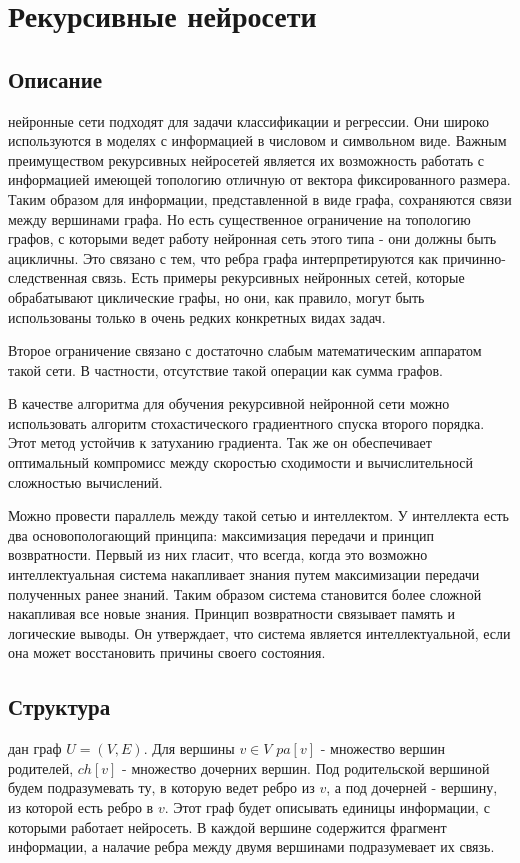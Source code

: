 \documentclass[14pt]{article}
\begin{document}
\section{Рекурсивные нейросети}

\subsection{Описание}
 нейронные сети подходят для задачи классификации и регрессии. Они широко используются в моделях с информацией в числовом и символьном виде. Важным преимуществом рекурсивных нейросетей является их возможность работать с информацией имеющей топологию отличную от вектора фиксированного размера. Таким образом для информации, представленной в виде графа, сохраняются связи между вершинами графа. Но есть существенное ограничение на топологию графов, с которыми ведет работу нейронная сеть этого типа - они должны быть ацикличны. Это связано с тем, что ребра графа интерпретируются как причинно-следственная связь. Есть примеры рекурсивных нейронных сетей, которые обрабатывают циклические графы, но они, как правило, могут быть использованы только в очень редких конкретных видах задач.


Второе ограничение связано с достаточно слабым математическим аппаратом такой сети. В частности, отсутствие такой операции как сумма графов.


В качестве алгоритма для обучения рекурсивной нейронной сети можно использовать алгоритм стохастического градиентного спуска второго порядка. Этот метод устойчив к затуханию градиента. Так же он обеспечивает оптимальный компромисс между скоростью сходимости и вычислительносй сложностью вычислений.


Можно провести параллель между такой сетью и интеллектом. У интеллекта есть два основопологающий принципа: максимизация передачи и принцип возвратности. Первый из них гласит, что всегда, когда это возможно интеллектуальная система накапливает знания путем максимизации передачи полученных ранее знаний. Таким образом система становится более сложной накапливая все новые знания. Принцип возвратности связывает память и логические выводы. Он утверждает, что система является интеллектуальной, если она может восстановить причины своего состояния.

\subsection{Структура}
 дан граф $U = (V, E)$. Для вершины $v\in V$ $pa[v]$ - множество вершин родителей, $ch[v]$ - множество  дочерних вершин. Под родительской вершиной будем подразумевать ту, в которую ведет ребро из $v$, а под дочерней - вершину, из которой есть ребро в $v$. Этот граф будет описывать единицы информации, с которыми работает нейросеть. В каждой вершине содержится фрагмент информации, а налачие ребра между двумя вершинами подразумевает их связь.
\end{document}

